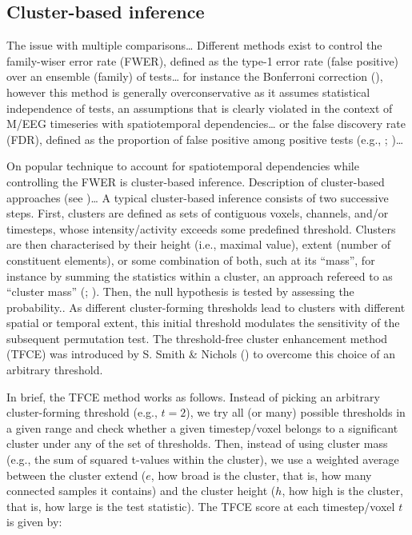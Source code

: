 \documentclass[
  man,
  floatsintext,
  longtable,
  a4paper,
  nolmodern,
  notxfonts,
  notimes,
  colorlinks=true,linkcolor=blue,citecolor=blue,urlcolor=blue]{apa7}
\begin{document}
\subsection{Cluster-based inference}\label{cluster-based-inference}

The issue with multiple comparisons\ldots{} Different methods exist to
control the family-wiser error rate (FWER), defined as the type-1 error
rate (false positive) over an ensemble (family) of tests\ldots{} for
instance the Bonferroni correction (), however this method is generally overconservative as it assumes
statistical independence of tests, an assumptions that is clearly
violated in the context of M/EEG timeseries with spatiotemporal
dependencies\ldots{} or the false discovery rate (FDR), defined as the
proportion of false positive among positive tests (e.g.,
;
)\ldots{}

On popular technique to account for spatiotemporal dependencies while
controlling the FWER is cluster-based inference. Description of
cluster-based approaches (see )\ldots{} A typical cluster-based inference consists
of two successive steps. First, clusters are defined as sets of
contiguous voxels, channels, and/or timesteps, whose intensity/activity
exceeds some predefined threshold. Clusters are then characterised by
their height (i.e., maximal value), extent (number of constituent
elements), or some combination of both, such at its ``mass'', for
instance by summing the statistics within a cluster, an approach
refereed to as ``cluster mass'' (; ).
Then, the null hypothesis is tested by assessing the probability.. As
different cluster-forming thresholds lead to clusters with different
spatial or temporal extent, this initial threshold modulates the
sensitivity of the subsequent permutation test. The threshold-free
cluster enhancement method (TFCE) was introduced by S. Smith \& Nichols
() to overcome this choice of an arbitrary
threshold.

In brief, the TFCE method works as follows. Instead of picking an
arbitrary cluster-forming threshold (e.g., \(t=2\)), we try all (or
many) possible thresholds in a given range and check whether a given
timestep/voxel belongs to a significant cluster under any of the set of
thresholds. Then, instead of using cluster mass (e.g., the sum of
squared t-values within the cluster), we use a weighted average between
the cluster extend (\(e\), how broad is the cluster, that is, how many
connected samples it contains) and the cluster height (\(h\), how high
is the cluster, that is, how large is the test statistic). The TFCE
score at each timestep/voxel \(t\) is given by:
\end{document}
